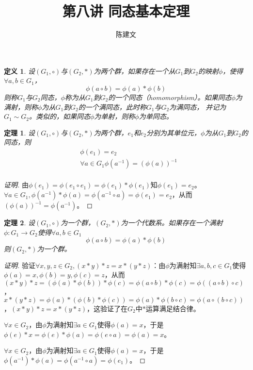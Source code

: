 \documentclass{article}
\newtheorem{Def}{定义}
\newtheorem{Thm}{定理}
\begin{document}
\begin{CJK*}{UTF8}{gbsn}
  \title{第八讲 同态基本定理}
  \author{陈建文}
  \maketitle
  
  \begin{Def}
    设$(G_1,\circ)$与$(G_2,*)$为两个群，如果存在一个从$G_1$到$G_2$的映射$\phi$，使得$\forall a,b\in G_1$，\[\phi(a\circ b)=\phi(a)* \phi(b)\]
    则称$G_1$与$G_2$同态，$\phi$称为从$G_1$到$G_2$的一个同态（homomorphism）。如果同态$\phi$为满射，则称$\phi$为从$G_1$到$G_2$的一个满同态，此时称$G_1$与$G_2$为满同态，
    并记为$G_1\sim G_2$。类似的，如果同态$\phi$为单射，则称$\phi$为单同态。
  \end{Def}
  
  \begin{Thm}
    设$(G_1,\circ)$与$(G_2,*)$为两个群，$e_1$和$e_2$分别为其单位元，$\phi$为从$G_1$到$G_2$的同态，则
    \begin{align*}
      &\phi(e_1)=e_2\\
      &\forall a\in G_1 \phi(a^{-1})=(\phi(a))^{-1}\\
    \end{align*}
  \end{Thm}
  \begin{proof}[证明]
    由$\phi(e_1)=\phi(e_1\circ e_1)=\phi(e_1)*\phi(e_1)$知$\phi(e_1)=e_2$。
    $\forall a\in G_1, \phi(a^{-1})*\phi(a)=\phi(a^{-1}\circ a)=\phi(e_1)=e_2$，从而$(\phi(a))^{-1}=\phi(a^{-1})$。
  \end{proof}
  \begin{Thm}
    设$(G_1,\circ)$为一个群，$(G_2,*)$为一个代数系。如果存在一个满射$\phi:G_1\to G_2$使得$\forall a,b\in G_1$
    \[\phi(a\circ b)=\phi(a) * \phi(b)\]
    则$(G_2,*)$为一个群。
  \end{Thm}
  \begin{proof}[证明]
    验证$\forall x,y,z\in G_2,(x*y)*z=x*(y*z)$：由$\phi$为满射知$\exists a,b,c\in G_1$使得$\phi(a)=x,\phi(b)=y,\phi(c)=z$，从而
    $(x*y)*z=(\phi(a)*\phi(b))*\phi(c)=\phi(a\circ b)*\phi(c)=\phi((a\circ b)\circ c)$，$x*(y*z)=\phi(a)* (\phi(b)*\phi(c))=\phi(a)*\phi(b\circ c)=\phi(a\circ (b\circ c))$，$(x*y)*z=x*(y*z)$，这验证了在$G_2$中$*$运算满足结合律。
  
    $\forall x\in G_2$，由$\phi$为满射知$\exists a\in G_1$使得$\phi(a)=x$，于是$\phi(e)*x=\phi(e)*\phi(a)=\phi(e\circ a)=\phi(a)=x$。
  
    $\forall x\in G_2$，由$\phi$为满射知$\exists a\in G_1$使得$\phi(a)=x$，于是$\phi(a^{-1})*\phi(a)=\phi(a^{-1}\circ a)=\phi(e_1)$。
  \end{proof}
  

\end{CJK*}
\end{document}
